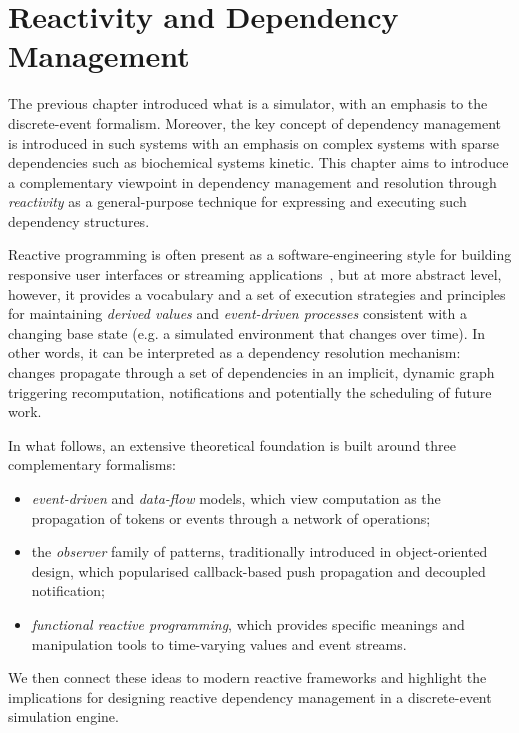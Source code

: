 \chapter{Reactivity and Dependency Management}\label{ch:reactvity_dep_mgmnt}

The previous chapter introduced what is a simulator, with an emphasis to the
discrete-event formalism. Moreover, the key concept of dependency management is
introduced in such systems with an emphasis on complex systems with sparse
dependencies such as biochemical systems kinetic. This chapter aims to
introduce a complementary viewpoint in dependency management and resolution
through \emph{reactivity} as a general-purpose technique for expressing and
executing such dependency structures.

Reactive programming is often present as a software-engineering style for
building responsive user interfaces or streaming
applications~\cite{kuhn2017RDP}, but at more abstract level, however, it
provides a vocabulary and a set of execution strategies and principles for
maintaining \emph{derived values} and \emph{event-driven processes} consistent
with a changing base state (e.g. a simulated environment that changes over
time). In other words, it can be interpreted as a dependency resolution
mechanism: changes propagate through a set of dependencies in an implicit,
dynamic graph triggering recomputation, notifications and potentially the
scheduling of future work.

In what follows, an extensive theoretical foundation is built around three
complementary formalisms:
\begin{itemize}
	\item \emph{event-driven} and \emph{data-flow} models, which view
	      computation as the propagation of tokens or events through a network of
	      operations;
	\item the \emph{observer} family of patterns, traditionally introduced in
	      object-oriented design, which popularised callback-based push
	      propagation and decoupled notification;
	\item \emph{functional reactive programming}, which provides specific
	      meanings and manipulation tools to time-varying values and event
	      streams.
\end{itemize}
We then connect these ideas to modern reactive frameworks and highlight the
implications for designing reactive dependency management in a discrete-event
simulation engine.

